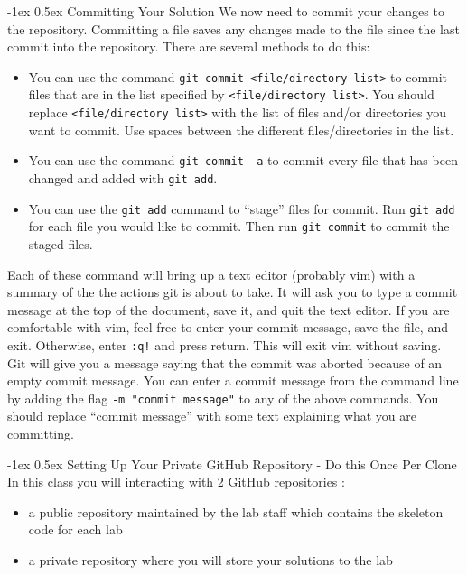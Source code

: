 \documentclass[11pt]{article}
\makeatletter
\renewcommand{\subsection}
{\@startsection {subsection}{1}{0pt}
 {-1ex}
 {0.5ex}
 {\bfseries\normalsize}}
\makeatother
\begin{document}
\subsection{Committing Your Solution}
We now need to commit your changes to the repository.  Committing a file saves any changes made to the file since the last commit into the repository.  There are several methods to do this:
\begin{itemize}
\item You can use the command \verb|git commit <file/directory list>| to commit files that are in the list specified by \verb|<file/directory list>|.  You should replace \verb|<file/directory list>| with the list of files and/or directories you want to commit.  Use spaces between the different files/directories in the list.
\item You can use the command \verb|git commit -a| to commit every file that has been changed and added with \verb|git add|.
\item You can use the \verb|git add| command to ``stage'' files for commit.  Run \verb|git add| for each file you would like to commit.  Then run \verb|git commit| to commit the staged files.
\end{itemize}

Each of these command will bring up a text editor (probably vim) with a summary of the the actions git is about to take.  It will ask you to type a commit message at the top of the document, save it, and quit the text editor.  If you are comfortable with vim, feel free to enter your commit message, save the file, and exit.  Otherwise, enter \verb|:q!| and press return.  This will exit vim without saving.  Git will give you a message saying that the commit was aborted because of an empty commit message.  You can enter a commit message from the command line by adding the flag \verb|-m "commit message"| to any of the above commands.  You should replace ``commit message'' with some text explaining what you are committing.

\subsection{Setting Up Your Private GitHub Repository - Do this Once Per Clone}
In this class you will interacting with 2 GitHub repositories :
\begin{itemize}
\item a public repository maintained by the lab staff which contains the skeleton code for each lab
\item a private repository where you will store your solutions to the lab
\end{itemize}
\end{document}
